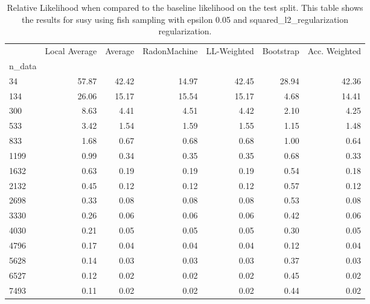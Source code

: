 \begin{table}
\centering
\caption{Relative Likelihood when compared to the baseline likelihood on the test split. This table shows the results for  susy using  fish sampling with epsilon  0.05 and  squared_l2_regularization regularization.}
\label{tab:15}
\begin{tabular}{lrrrrrr}
\toprule
{} &  Local Average &  Average &  RadonMachine &  LL-Weighted &  Bootstrap &  Acc. Weighted \\
n\_data &                &          &               &              &            &                \\
\midrule
34     &          57.87 &    42.42 &         14.97 &        42.45 &      28.94 &          42.36 \\
134    &          26.06 &    15.17 &         15.54 &        15.17 &       4.68 &          14.41 \\
300    &           8.63 &     4.41 &          4.51 &         4.42 &       2.10 &           4.25 \\
533    &           3.42 &     1.54 &          1.59 &         1.55 &       1.15 &           1.48 \\
833    &           1.68 &     0.67 &          0.68 &         0.68 &       1.00 &           0.64 \\
1199   &           0.99 &     0.34 &          0.35 &         0.35 &       0.68 &           0.33 \\
1632   &           0.63 &     0.19 &          0.19 &         0.19 &       0.54 &           0.18 \\
2132   &           0.45 &     0.12 &          0.12 &         0.12 &       0.57 &           0.12 \\
2698   &           0.33 &     0.08 &          0.08 &         0.08 &       0.53 &           0.08 \\
3330   &           0.26 &     0.06 &          0.06 &         0.06 &       0.42 &           0.06 \\
4030   &           0.21 &     0.05 &          0.05 &         0.05 &       0.30 &           0.05 \\
4796   &           0.17 &     0.04 &          0.04 &         0.04 &       0.12 &           0.04 \\
5628   &           0.14 &     0.03 &          0.03 &         0.03 &       0.37 &           0.03 \\
6527   &           0.12 &     0.02 &          0.02 &         0.02 &       0.45 &           0.02 \\
7493   &           0.11 &     0.02 &          0.02 &         0.02 &       0.44 &           0.02 \\
\bottomrule
\end{tabular}
\end{table}
